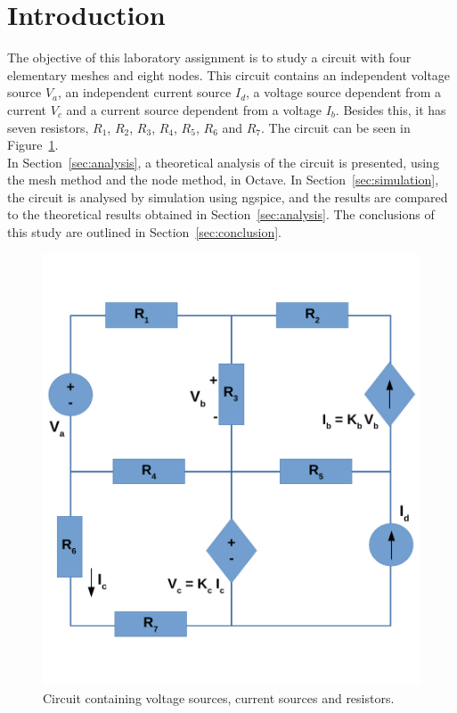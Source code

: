 \newpage
\section{Introduction}
\label{sec:introduction}

The objective of this laboratory assignment is to study a circuit with four elementary meshes and eight nodes. 
This circuit contains an independent voltage source $V_a$, an independent current source $I_d$, 
a voltage source dependent from a current $V_c$ and a current source dependent from a voltage $I_b$.
Besides this, it has seven resistors, $R_1$, $R_2$, $R_3$, $R_4$, $R_5$, $R_6$ and $R_7$. The circuit can be seen in Figure~\ref{fig:Circuit}.\\
In Section~\ref{sec:analysis}, a theoretical analysis of the circuit is
presented, using the mesh method and the node method, in Octave. In Section~\ref{sec:simulation}, the circuit is analysed by
simulation using ngspice, and the results are compared to the theoretical results obtained in
Section~\ref{sec:analysis}. The conclusions of this study are outlined in
Section~\ref{sec:conclusion}.

\begin{figure}[h] \centering
\includegraphics[width=0.6\linewidth]{Circuit.pdf}
\caption{Circuit containing voltage sources, current sources and resistors.}
\label{fig:Circuit}
\end{figure}

